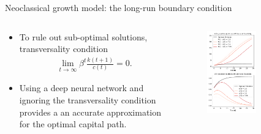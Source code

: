 \documentclass[aspectratio=169,10pt]{beamer}
\begin{document}
\begin{frame}{Neoclassical growth model: the long-run boundary condition}
	\begin{columns}
		\begin{column}{0.5\textwidth}
			\begin{itemize}
				\item To rule out sub-optimal solutions, transversality condition
				\begin{align*}
					\lim_{t\rightarrow \infty}\beta^t \frac{k(t+1)}{c(t)} = 0.
				\end{align*}
				\vspace{0.1in}
				\item  Using a deep neural network and ignoring the transversality condition provides a an accurate approximation for the optimal capital path.
			\end{itemize}
		\end{column}
		\begin{column}{0.5\textwidth}
			\begin{figure}[t!]
				\centering
				\includegraphics[width=0.6\textwidth]{figs/TVC_violation.pdf}
				\vspace{-7mm}
			\end{figure}
		\end{column}
	\end{columns}
\end{frame}
\end{document}
